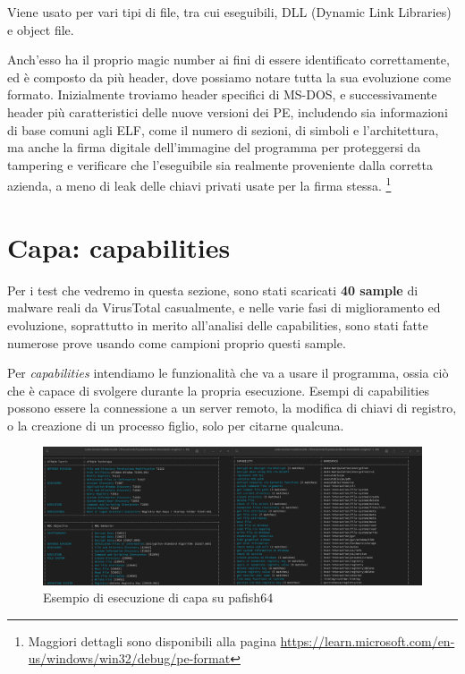 Viene usato per vari tipi di file, tra cui eseguibili, DLL (Dynamic Link Libraries) e object file.

Anch'esso ha il proprio magic number ai fini di essere identificato correttamente, ed è composto da più header, dove possiamo notare tutta la sua evoluzione come formato. Inizialmente troviamo header specifici di MS-DOS, e successivamente header più caratteristici delle nuove versioni dei PE, includendo sia informazioni di base comuni agli ELF, come il numero di sezioni, di simboli e l'architettura, ma anche la firma digitale dell'immagine del programma per proteggersi da tampering e verificare che l'eseguibile sia realmente proveniente dalla corretta azienda, a meno di leak delle chiavi privati usate per la firma stessa.
\footnote{Maggiori dettagli sono disponibili alla pagina \url{https://learn.microsoft.com/en-us/windows/win32/debug/pe-format}}

\section{Capa: capabilities}
\label{chap:capa}
Per i test che vedremo in questa sezione, sono stati scaricati \textbf{40 sample} di malware reali da VirusTotal casualmente, e nelle varie fasi di miglioramento ed evoluzione, soprattutto in merito all'analisi delle capabilities, sono stati fatte numerose prove usando come campioni proprio questi sample.

Per \emph{capabilities} intendiamo le funzionalità che va a usare il programma, ossia ciò che è capace di svolgere durante la propria esecuzione. Esempi di capabilities possono essere la connessione a un server remoto, la modifica di chiavi di registro, o la creazione di un processo figlio, solo per citarne qualcuna.

\begin{figure}[!htb]
    \centering
    \includegraphics[width=\textwidth]{assets/capa_example_invocation.png}
    \caption{Esempio di esecuzione di capa su pafish64}
    \label{fig:capa_example_invocation}
\end{figure}


